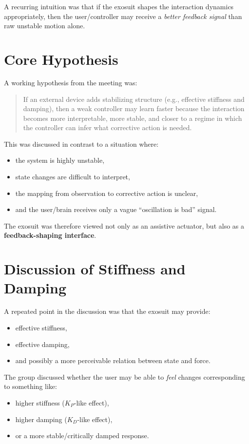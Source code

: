 \documentclass[11pt]{article}
\begin{document}
A recurring intuition was that if the exosuit shapes the interaction dynamics appropriately, then the user/controller may receive a \emph{better feedback signal} than raw unstable motion alone.

\section{Core Hypothesis}
A working hypothesis from the meeting was:

\begin{quote}
If an external device adds stabilizing structure (e.g., effective stiffness and damping), then a weak controller may learn faster because the interaction becomes more interpretable, more stable, and closer to a regime in which the controller can infer what corrective action is needed.
\end{quote}

This was discussed in contrast to a situation where:
\begin{itemize}[leftmargin=1.5em]
    \item the system is highly unstable,
    \item state changes are difficult to interpret,
    \item the mapping from observation to corrective action is unclear,
    \item and the user/brain receives only a vague ``oscillation is bad'' signal.
\end{itemize}

The exosuit was therefore viewed not only as an assistive actuator, but also as a \textbf{feedback-shaping interface}.

\section{Discussion of Stiffness and Damping}
A repeated point in the discussion was that the exosuit may provide:
\begin{itemize}[leftmargin=1.5em]
    \item effective stiffness,
    \item effective damping,
    \item and possibly a more perceivable relation between state and force.
\end{itemize}

The group discussed whether the user may be able to \emph{feel} changes corresponding to something like:
\begin{itemize}[leftmargin=1.5em]
    \item higher stiffness (\(K_P\)-like effect),
    \item higher damping (\(K_D\)-like effect),
    \item or a more stable/critically damped response.
\end{itemize}
\end{document}
